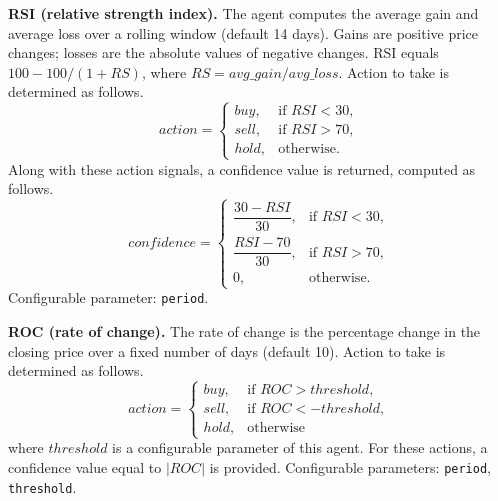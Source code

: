 \documentclass{icis}
\begin{document}
\textbf{RSI (relative strength index).} The agent computes the average gain and average loss over a rolling window (default 14 days). Gains are positive price changes; losses are the absolute values of negative changes. RSI equals $100 - 100/(1 + \mathit{RS})$, where $\mathit{RS} = \mathit{avg\_gain} / \mathit{avg\_loss}$. Action to take is determined as follows.
\begin{equation}
    action =
    \begin{cases}
        buy, & \text{if } RSI < 30, \\
        sell, & \text{if } RSI > 70, \\
        hold, & \text{otherwise.}
    \end{cases}
\end{equation}
Along with these action signals, a confidence value is returned, computed as follows.
\begin{equation}
    confidence =
    \begin{cases}
        \dfrac{30 - RSI}{30}, & \text{if } RSI < 30, \\
        \dfrac{RSI - 70}{30}, & \text{if } RSI > 70, \\
        0, & \text{otherwise.}
    \end{cases}
\end{equation}
Configurable parameter: \texttt{period}.

\textbf{ROC (rate of change).} The rate of change is the percentage change in the closing price over a fixed number of days (default 10). Action to take is determined as follows.
\begin{equation}
    action =
    \begin{cases}
        buy, & \text{if } ROC > threshold, \\
        sell, & \text{if } ROC < -threshold, \\
        hold, & \text{otherwise}
    \end{cases}
\end{equation}
where $threshold$ is a configurable parameter of this agent. For these actions, a confidence value equal to $|ROC|$ is provided. Configurable parameters: \texttt{period}, \texttt{threshold}.
\end{document}
